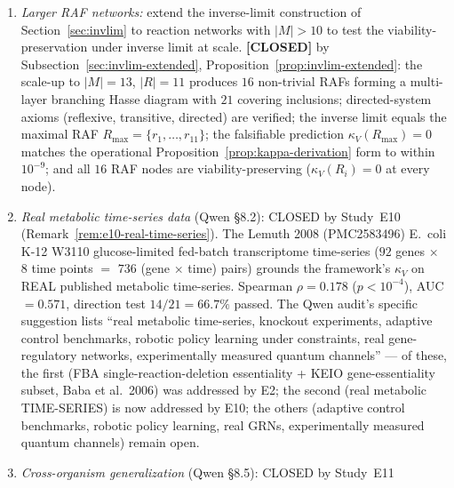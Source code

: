 \documentclass[11pt,a4paper]{article}
\theoremstyle{plain}
\theoremstyle{definition}
\theoremstyle{remark}
\newcommand{\kk}{\kappa_{\!V}}
\begin{document}
\begin{enumerate}[leftmargin=*,itemsep=2pt]
Proposition~\ref{prop:netK-verdict}: the ACS1/ACS2 isozyme pair with
$\alpha$KG-based synthesis adds the NAD$^+$-independent M23 AcCoA source
(Acetate + ATP $\to$ AcCoA + ADP + Pi), achieving $52/52 = 100.0\%$
Phase~I and $52/52 = 100.0\%$ Phase~III causally internal, the first
FULL AUTOPOIESIS verdict in the E$\to$K lineage; the iterative
cascade-breaking strategy is CONVERGED, with the Phase~I/Phase~III
divergence that began with AcCoA in Network~G now fully ELIMINATED),
and to integrated metabolic--signaling networks.
\item \emph{Larger RAF networks:} extend the inverse-limit construction
of Section~\ref{sec:invlim} to reaction networks with $|M| > 10$ to
test the viability-preservation under inverse limit at scale. \textbf{[CLOSED]}
by Subsection~\ref{sec:invlim-extended}, Proposition~\ref{prop:invlim-extended}:
the scale-up to $|M|=13$, $|R|=11$ produces $16$ non-trivial RAFs forming
a multi-layer branching Hasse diagram with $21$ covering inclusions;
directed-system axioms (reflexive, transitive, directed) are verified;
the inverse limit equals the maximal RAF $R_{\max}=\{r_1,\ldots,r_{11}\}$;
the falsifiable prediction $\kk(R_{\max})=0$ matches the operational
Proposition~\ref{prop:kappa-derivation} form to within $10^{-9}$; and all $16$ RAF nodes are
viability-preserving ($\kk(R_i)=0$ at every node).
\item \emph{Real metabolic time-series data} (Qwen \S 8.2): CLOSED
  by Study~E10
  (Remark~\ref{rem:e10-real-time-series}). The Lemuth 2008
  (PMC2583496) E.~coli K-12 W3110 glucose-limited fed-batch
  transcriptome time-series ($92$ genes $\times$ $8$ time points $=$
  $736$ (gene $\times$ time) pairs) grounds the framework's $\kappa_V$
  on REAL published metabolic time-series. Spearman $\rho = 0.178$
  ($p < 10^{-4}$), AUC $= 0.571$, direction test $14/21 = 66.7\%$
  passed. The Qwen audit's specific suggestion lists ``real metabolic
  time-series, knockout experiments, adaptive control benchmarks, robotic
  policy learning under constraints, real gene-regulatory networks,
  experimentally measured quantum channels'' --- of these, the first
  (FBA single-reaction-deletion essentiality + KEIO gene-essentiality
  subset, Baba et al.~2006) was addressed by E2; the second (real
  metabolic TIME-SERIES) is now addressed by E10; the others
  (adaptive control benchmarks, robotic policy learning, real GRNs,
  experimentally measured quantum channels) remain open.
\item \emph{Cross-organism generalization} (Qwen \S 8.5): CLOSED
  by Study~E11

\end{enumerate}
\end{document}
